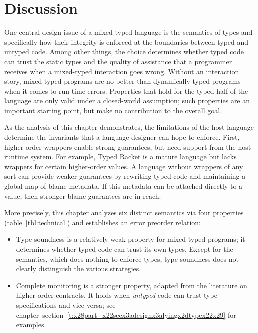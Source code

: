 \documentclass[ twoside,open=right,titlepage,numbers=noenddot,headinclude,%
                footinclude=true,cleardoublepage=empty,abstract=off,
                BCOR=5mm,paper=a4,fontsize=11pt,%
                ngerman,american,%
                parts,pdfspacing]{scrreprt}
\newcommand{\SecRef}[2]{section~#1}
\newcommand{\SecRefLocal}[3]{\hyperref[#1]{\SecRef{#2}{#3}}}
\newlength{\stabLeft}
\newcommand{\atItemizeStart}[0]{\addtolength{\stabLeft}{\labelsep}
                                \addtolength{\stabLeft}{\labelwidth}}
\let\SOriginalthesubsubsection\thesubsubsection
\newcommand{\Ssubsection}[2]{\subsection[#1]{#2}\let\thesubsubsection\SOriginalthesubsubsection}
\renewcommand{\Ssubsection}[2]{\section[#1]{#2}}
\renewcommand{\SecRefLocal}[3]{section~\ref{#1}}
\begin{document}
\Ssubsection{Discussion}{Discussion}\label{t:x28part_x22secx3adesignx3aconclusionx22x29}

One central design issue of a mixed{-}typed language is the semantics of
 types and specifically how their integrity is enforced at the boundaries between typed and untyped code.
Among other things, the choice determines whether typed code can trust
 the static types and the quality of assistance that a programmer receives
 when a mixed{-}typed interaction goes wrong.
Without an interaction story, mixed{-}typed programs are no better than
 dynamically{-}typed programs when it comes to run{-}time errors.
Properties that hold for the typed half of the language are only valid
 under a closed{-}world assumption;
 such properties are an important starting point, but make no contribution to
 the overall goal.

As the analysis of this chapter demonstrates, the limitations of
 the host language determine the invariants that a language designer can hope to enforce.
First, higher{-}order wrappers enable strong guarantees, but need support from the host
 runtime system.
For example, Typed Racket is a mature language but
 lacks wrappers for certain higher{-}order values.
A language without wrappers of any sort can provide weaker guarantees by
 rewriting typed code and maintaining a global map of blame metadata.
If this metadata can be attached directly to a value, then stronger
 blame guarantees are in reach.

More precisely, this chapter analyzes six distinct semantics via four properties (table~\ref{tbl:technical})
 and establishes an error preorder relation:

\begin{itemize}\atItemizeStart

\item Type soundness is a relatively weak property for mixed{-}typed programs;
 it determines whether typed code can trust its own types.
Except for the \relax{\ename} semantics, which does nothing to enforce types,
 type soundness does not clearly distinguish the various strategies.

\item Complete monitoring is a stronger property, adapted from the literature on
 higher{-}order contracts.
It holds when \emph{untyped} code can trust type specifications and vice{-}versa;
 see chapter~\SecRefLocal{t:x28part_x22secx3adesignx3alyingx2dtypex22x29}{4.2.3}{Uncovering the Source of a Mismatch} for examples.\end{itemize}
\end{document}

